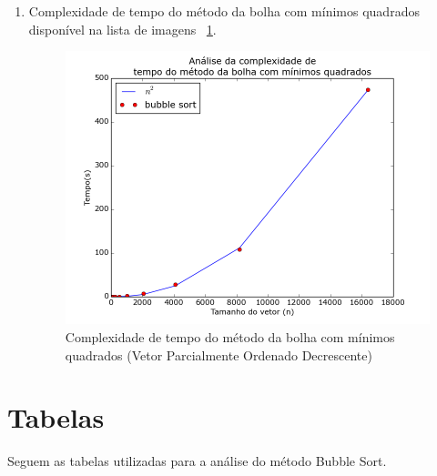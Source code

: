 \documentclass[12pt,a4paper,twoside]{report}
\begin{document}
\begin{enumerate}
\begin{enumerate}
											
											\item Complexidade de tempo do método da bolha com mínimos quadrados disponível na lista de imagens  ~\ref{fig:BubblePlot3POD}.
											\begin{figure}[!h]
												\centering
												\includegraphics[scale=0.6]{../imagens/Bubble/bubble_plot_3_parcialmente_ordenado_decrescente.png}
												\caption{Complexidade de tempo do método da bolha com mínimos quadrados (Vetor Parcialmente Ordenado Decrescente) \label{fig:BubblePlot3POD}}
											\end{figure}
										
										\end{enumerate}
			
	
\end{enumerate}

\chapter{Tabelas}

Seguem as tabelas utilizadas para a análise do método Bubble Sort.
\end{document}
